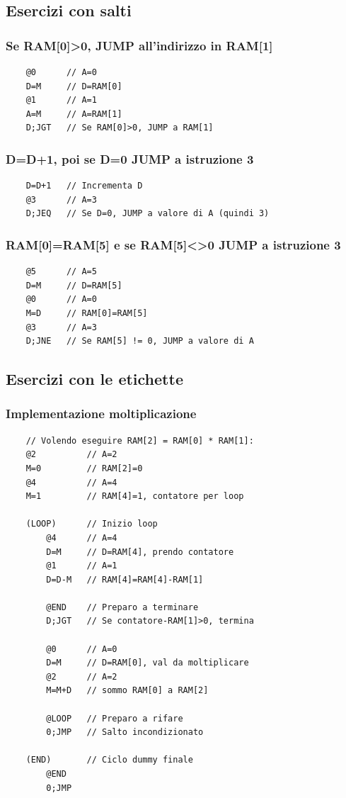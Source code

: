 \documentclass[12pt]{article}
\begin{document}
\subsection{Esercizi con salti}

\subsubsection{Se RAM[0]\textgreater 0, JUMP all'indirizzo in RAM[1]}
\begin{lstlisting}
    @0      // A=0
    D=M     // D=RAM[0]
    @1      // A=1
    A=M     // A=RAM[1]
    D;JGT   // Se RAM[0]>0, JUMP a RAM[1]
\end{lstlisting}

\subsubsection{D=D+1, poi se D=0 JUMP a istruzione 3}
\begin{lstlisting}
    D=D+1   // Incrementa D
    @3      // A=3
    D;JEQ   // Se D=0, JUMP a valore di A (quindi 3)
\end{lstlisting}

\pagebreak
\subsubsection{RAM[0]=RAM[5] e se RAM[5]\textless\textgreater 0 JUMP a istruzione 3}
\begin{lstlisting}
    @5      // A=5
    D=M     // D=RAM[5]
    @0      // A=0
    M=D     // RAM[0]=RAM[5]
    @3      // A=3
    D;JNE   // Se RAM[5] != 0, JUMP a valore di A
\end{lstlisting}

\subsection{Esercizi con le etichette}

\subsubsection{Implementazione moltiplicazione}
\begin{lstlisting}
    // Volendo eseguire RAM[2] = RAM[0] * RAM[1]:
    @2          // A=2
    M=0         // RAM[2]=0
    @4          // A=4
    M=1         // RAM[4]=1, contatore per loop

    (LOOP)      // Inizio loop
        @4      // A=4
        D=M     // D=RAM[4], prendo contatore
        @1      // A=1 
        D=D-M   // RAM[4]=RAM[4]-RAM[1]
        
        @END    // Preparo a terminare
        D;JGT   // Se contatore-RAM[1]>0, termina

        @0      // A=0
        D=M     // D=RAM[0], val da moltiplicare
        @2      // A=2
        M=M+D   // sommo RAM[0] a RAM[2]

        @LOOP   // Preparo a rifare
        0;JMP   // Salto incondizionato
    
    (END)       // Ciclo dummy finale
        @END
        0;JMP
\end{lstlisting}
\end{document}
